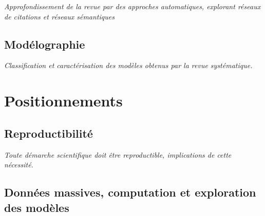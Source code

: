 




\textit{Approfondissement de la revue par des approches automatiques, explorant réseaux de citations et réseaux sémantiques}



\subsection{Modélographie}

\textit{Classification et caractérisation des modèles obtenus par la revue systématique.}




\section{Positionnements}


\subsection{Reproductibilité}

\textit{Toute démarche scientifique doit être reproductible, implications de cette nécessité.}


\subsection{Données massives, computation et exploration des modèles}


